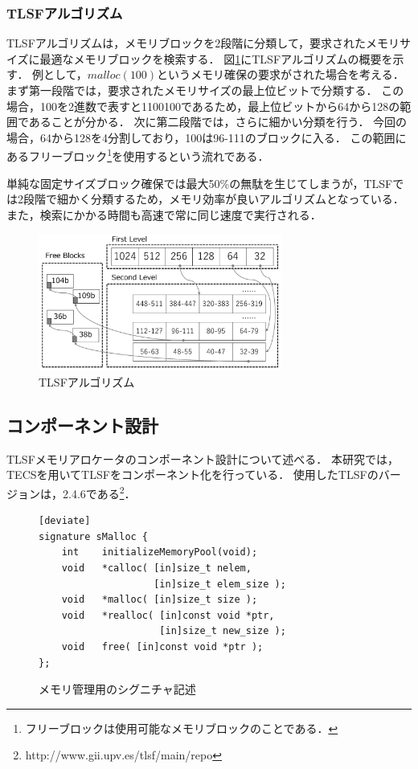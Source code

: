 \documentclass[submit,techrep]{ipsj_v2/UTF8/ipsj}
\begin{document}
\subsubsection{TLSFアルゴリズム}

TLSFアルゴリズムは，メモリブロックを2段階に分類して，要求されたメモリサイズに最適なメモリブロックを検索する．
図\ref{fig:TLSF}にTLSFアルゴリズムの概要を示す．
例として，$malloc(100)$というメモリ確保の要求がされた場合を考える．
まず第一段階では，要求されたメモリサイズの最上位ビットで分類する．
この場合，100を2進数で表すと1100100であるため，最上位ビットから64から128の範囲であることが分かる．
次に第二段階では，さらに細かい分類を行う．
今回の場合，64から128を4分割しており，100は96-111のブロックに入る．
この範囲にあるフリーブロック\footnote{フリーブロックは使用可能なメモリブロックのことである．}を使用するという流れである．

単純な固定サイズブロック確保では最大50\%の無駄を生じてしまうが，TLSFでは2段階で細かく分類するため，メモリ効率が良いアルゴリズムとなっている．
また，検索にかかる時間も高速で常に同じ速度で実行される．


\begin{figure}[t]
    \centering
    \includegraphics[width=8cm,clip]{figure/TLSF.pdf}
    \caption{TLSFアルゴリズム}
    \label{fig:TLSF}
\end{figure}


\subsection{コンポーネント設計}

TLSFメモリアロケータのコンポーネント設計について述べる．
本研究では，TECSを用いてTLSFをコンポーネント化を行っている．
使用したTLSFのバージョンは，2.4.6である\footnote{http://www.gii.upv.es/tlsf/main/repo}．

\begin{figure}[t]
\centering
\begin{lstlisting}
[deviate]
signature sMalloc {
    int    initializeMemoryPool(void);
    void   *calloc( [in]size_t nelem,
                    [in]size_t elem_size );
    void   *malloc( [in]size_t size );
    void   *realloc( [in]const void *ptr,
                     [in]size_t new_size );
    void   free( [in]const void *ptr );
};
\end{lstlisting}
\caption{メモリ管理用のシグニチャ記述}  
\label{src:TLSFSignature}
\end{figure}
\end{document}
